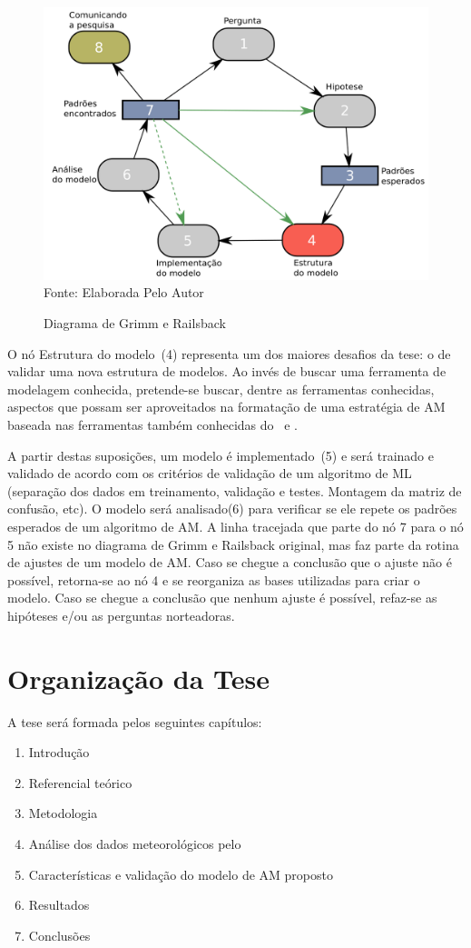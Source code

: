 \begin{figure}[!htb]
	\centering
	\caption{Diagrama de Grimm e Railsback}
	\includegraphics[width=.8\textwidth]{../Figures/intro/Ciclo_Grimm.png}
	\\{\footnotesize Fonte: Elaborada Pelo Autor}
	\label{fig:fluxoGrimm}
\end{figure}

O nó Estrutura do modelo~(4) representa um dos maiores desafios da tese: o de validar uma nova estrutura de modelos. Ao invés de buscar uma ferramenta de modelagem conhecida, pretende-se buscar, dentre as ferramentas conhecidas, aspectos que possam ser aproveitados na formatação de uma estratégia de AM baseada nas ferramentas também conhecidas do \pdcca~e \dmc.

A partir destas suposições, um modelo é implementado~(5) e será trainado e validado de acordo com os critérios de validação de um algoritmo de ML (separação dos dados em treinamento, validação e testes. Montagem da matriz de confusão, etc). O modelo será analisado(6) para verificar se ele repete os padrões esperados de um algoritmo de AM. A linha tracejada que parte do nó 7 para o nó 5 não existe no diagrama de Grimm e Railsback original, mas faz parte da rotina de ajustes de um modelo de AM. Caso se chegue a conclusão que o ajuste não é possível, retorna-se ao nó 4 e se reorganiza as bases utilizadas para criar o modelo. Caso se chegue a conclusão que nenhum ajuste é possível, refaz-se as hipóteses e/ou as perguntas norteadoras. 


\section{Organização da Tese}
\label{sec:organizacao}

A tese será formada pelos seguintes capítulos:
\begin{enumerate}
	\item Introdução
	\item Referencial teórico
	\item Metodologia
	\item Análise dos dados meteorológicos pelo \dmc
	\item Características e validação do modelo de AM proposto
	\item Resultados
	\item Conclusões
\end{enumerate}